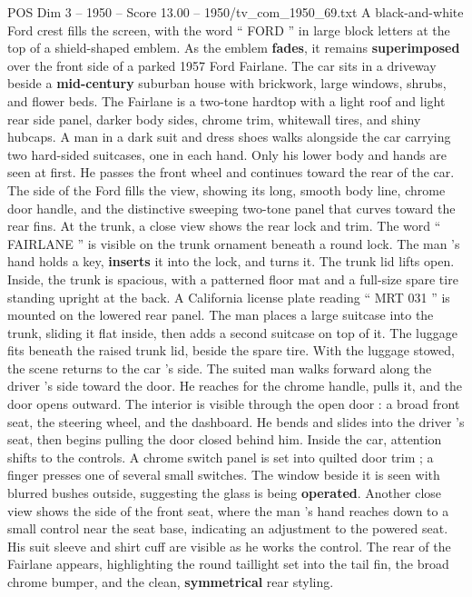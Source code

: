 \begin{textsample}{POS Dim 3 – 1950 – Score 13.00 – 1950/tv\_com\_1950\_69.txt}  \label{ex:f3_pos_010}
A black-and-white Ford crest fills the screen, with the word “ FORD ” in large block letters at the top of a shield-shaped emblem.
As the emblem \textbf{fades}, it remains \textbf{superimposed} over the front side of a parked 1957 Ford Fairlane.
The car sits in a driveway beside a \textbf{mid-century} suburban house with brickwork, large windows, shrubs, and flower beds.
The Fairlane is a two-tone hardtop with a light roof and light rear side panel, darker body sides, chrome trim, whitewall tires, and shiny hubcaps.
A man in a dark suit and dress shoes walks alongside the car carrying two hard-sided suitcases, one in each hand.
Only his lower body and hands are seen at first.
He passes the front wheel and continues toward the rear of the car.
The side of the Ford fills the view, showing its long, smooth body line, chrome door handle, and the distinctive sweeping two-tone panel that curves toward the rear fins.
At the trunk, a close view shows the rear lock and trim.
The word “ FAIRLANE ” is visible on the trunk ornament beneath a round lock.
The man ’s hand holds a key, \textbf{inserts} it into the lock, and turns it.
The trunk lid lifts open.
Inside, the trunk is spacious, with a patterned floor mat and a full-size spare tire standing upright at the back.
A California license plate reading “ MRT 031 ” is mounted on the lowered rear panel.
The man places a large suitcase into the trunk, sliding it flat inside, then adds a second suitcase on top of it.
The luggage fits beneath the raised trunk lid, beside the spare tire.
With the luggage stowed, the scene returns to the car ’s side.
The suited man walks forward along the driver ’s side toward the door.
He reaches for the chrome handle, pulls it, and the door opens outward.
The interior is visible through the open door : a broad front seat, the steering wheel, and the dashboard.
He bends and slides into the driver ’s seat, then begins pulling the door closed behind him.
Inside the car, attention shifts to the controls.
A chrome switch panel is set into quilted door trim ; a finger presses one of several small switches.
The window beside it is seen with blurred bushes outside, suggesting the glass is being \textbf{operated}.
Another close view shows the side of the front seat, where the man ’s hand reaches down to a small control near the seat base, indicating an adjustment to the powered seat.
His suit sleeve and shirt cuff are visible as he works the control.
The rear of the Fairlane appears, highlighting the round taillight set into the tail fin, the broad chrome bumper, and the clean, \textbf{symmetrical} rear styling.

\end{textsample}
